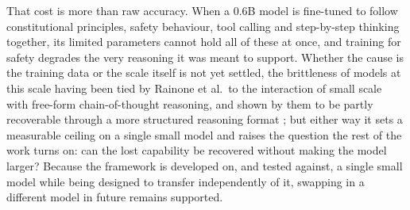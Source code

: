 
That cost is more than raw accuracy. When a 0.6B model is fine-tuned to follow constitutional principles, safety behaviour, tool calling and step-by-step thinking together, its limited parameters cannot hold all of these at once, and training for safety degrades the very reasoning it was meant to support. Whether the cause is the training data or the scale itself is not yet settled, the brittleness of models at this scale having been tied by Rainone et al.\ to the interaction of small scale with free-form chain-of-thought reasoning, and shown by them to be partly recoverable through a more structured reasoning format \cite{rainone2025replacingthinkingtoolusage}; but either way it sets a measurable ceiling on a single small model and raises the question the rest of the work turns on: can the lost capability be recovered without making the model larger? Because the framework is developed on, and tested against, a single small model while being designed to transfer independently of it, swapping in a different model in future remains supported.

